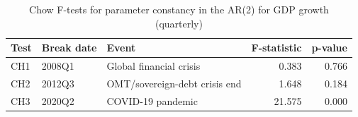 \begin{table}

\caption{\label{tab:chow-tests}Chow F-tests for parameter constancy in the AR(2) for GDP growth (quarterly)}
\centering
\begin{tabular}[t]{lllrr}
\toprule
Test & Break date & Event & F-statistic & p-value\\
\midrule
CH1 & 2008Q1 & Global financial crisis & 0.383 & 0.766\\
CH2 & 2012Q3 & OMT/sovereign-debt crisis end & 1.648 & 0.184\\
CH3 & 2020Q2 & COVID-19 pandemic & 21.575 & 0.000\\
\bottomrule
\end{tabular}
\end{table}

